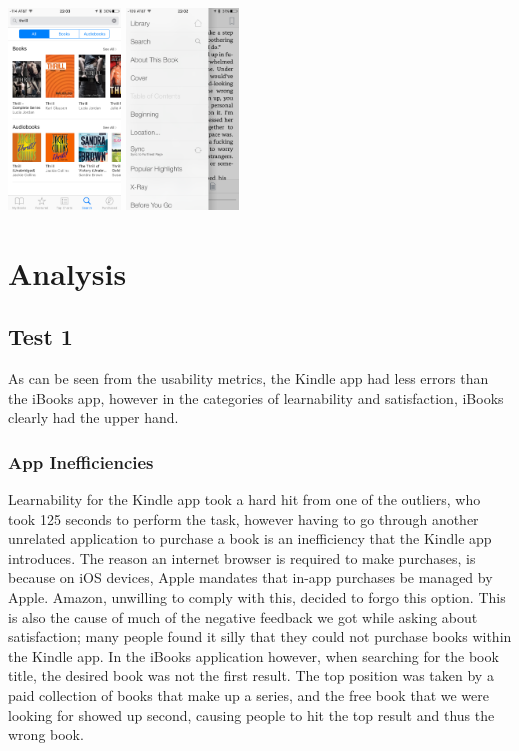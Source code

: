 \documentclass[11pt, oneside]{article}
\begin{document}
\includegraphics[keepaspectratio, width=3cm]{SearchResults.png}
\includegraphics[keepaspectratio, width=3cm]{SearchButton.png}

\section{Analysis}
\subsection{Test 1}
As can be seen from the usability metrics, the Kindle app had less errors than the iBooks app, however in the categories of learnability and satisfaction, iBooks clearly had the upper hand.
\subsubsection{App Inefficiencies}
Learnability for the Kindle app took a hard hit from one of the outliers, who took 125 seconds to perform the task, however having to go through another unrelated application to purchase a book is an inefficiency that the Kindle app introduces. The reason an internet browser is required to make purchases, is because on iOS devices, Apple mandates that in-app purchases be managed by Apple. Amazon, unwilling to comply with this, decided to forgo this option. This is also the cause of much of the negative feedback we got while asking about satisfaction; many people found it silly that they could not purchase books within the Kindle app. In the iBooks application however, when searching for the book title, the desired book was not the first result. The top position was taken by a paid collection of books that make up a series, and the free book that we were looking for showed up second, causing people to hit the top result and thus the wrong book.
\end{document}
